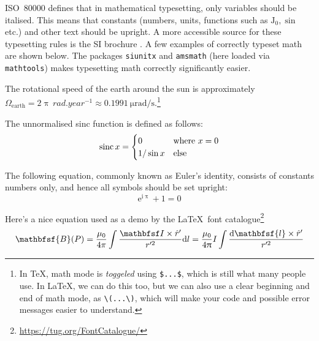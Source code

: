 \begin{refsection}
ISO~\num{80000} \cite{ISO80000} defines that in mathematical typesetting, only variables should be italised. This means that constants (numbers, units, functions such as \(\mathrm J_0, \sin\) etc.) and other text should be upright.
A more accessible source for these typesetting rules is the SI brochure \cite[\S 2.3.1]{SIbrochure}. A few examples of correctly typeset math are shown below. The packages \texttt{siunitx} and \texttt{amsmath} (here loaded via \texttt{mathtools}) makes typesetting math correctly significantly easier.

The rotational speed of the earth around the sun is approximately \(\varOmega_\text{earth} = 2 \uppi\,\si{rad.year^{-1}} \approx \SI{0.1991}{\micro\radian\per\second}\).\footnote{In \TeX, math mode is \emph{toggeled} using \texttt{\$...\$}, which is still what many people use. In \LaTeX, we can do this too, but we can also use a clear beginning and end of math mode, as \texttt{\textbackslash(...\textbackslash)}, which will make your code and possible error messages easier to understand.}

The unnormalised sinc function is defined as follows:
\begin{equation}
  \operatorname{sinc} x = \begin{cases}
    0 & \text{where \(x = 0\)}\\
    1 / \sin x & \text{else}
  \end{cases}
\end{equation}

The following equation, commonly known as Euler's identity, consists of constants numbers only, and hence all symbols should be set upright:
\begin{equation}
  \mathrm e^{\mathrm i \uppi} + 1 = 0
\end{equation}

Here's a nice equation used as a demo by the \LaTeX\ font catalogue\footnote{\url{https://tug.org/FontCatalogue/}}
\begin{equation}
  \mathbfsf{B}(P)=\frac{\mu_0}{4\pi}\int\frac{\mathbfsf I \times \hat r ' }{r'^2} \mathrm dl
    = \frac{\mu_0}{4\uppi}I\int\frac{\mathrm d\mathbfsf{l}\times\hat r'}{r'^2}
\end{equation}

\makeatletter
\if@fourier
  
\else
  
\fi
\makeatother

\endgroup
\end{refsection}
